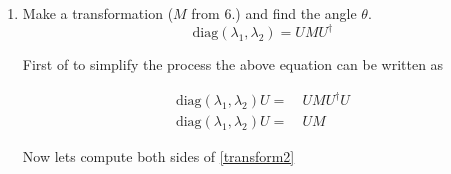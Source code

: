 \documentclass[11pt,letterpaper]{article}%
\begin{document}
\begin{enumerate}[label=\Large{\textbf{\arabic*.}}]
{{\begin{enumerate}[label=\textit{\roman*.}]
{Now lets compute $U^\dag U$
\begin{equation}
\label{UUdag}
\begin{split}
U^\dag U =&
\begin{pmatrix}
\cos(\theta)\cos(\theta) + \sin(\theta)\sin(\theta) & -\cos(\theta)\sin(\theta) + \sin(\theta)\cos(\theta)\\
-\sin(\theta)\cos(\theta) + \cos(\theta)\sin(\theta) & \sin(\theta)\sin(\theta) + \cos(\theta)\cos(\theta)
\end{pmatrix}\\
\\
=& \begin{pmatrix}
\cos(\theta)^2 + \sin(\theta)^2 & \sin(\theta)\cos(\theta) - \sin(\theta)\cos(\theta)\\
\sin(\theta)\cos(\theta) - \sin(\theta)\cos(\theta) & \sin(\theta)^2 + \cos(\theta)^2
\end{pmatrix}\\
\\
=& \begin{pmatrix}
1 & 0\\
0 & 1
\end{pmatrix}
\end{split}
\end{equation}
}

\item{
Make a transformation ($M$ from 6.) and find the angle $\theta$.
\begin{equation}
\label{transform1}
\text{diag}(\lambda_1,\lambda_2) = UMU^\dag
\end{equation}

First of to simplify the process the above equation can be written as

\begin{equation}
\label{transform2}
\begin{split}
\text{diag}(\lambda_1,\lambda_2)U =&\ UMU^\dag U\\
\text{diag}(\lambda_1,\lambda_2)U =&\ UM
\end{split}
\end{equation}
}

Now lets compute both sides of \eqref{transform2}


\end{enumerate}}}
\end{enumerate}
\end{document}
